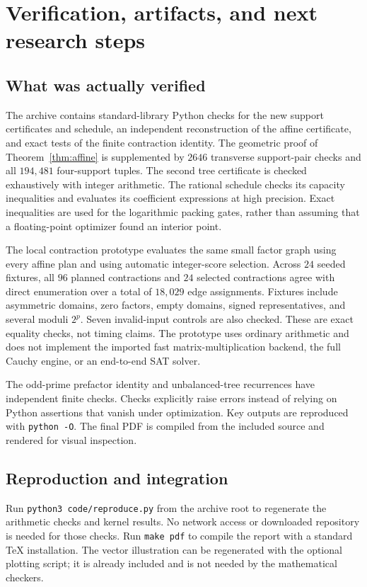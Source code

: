 \section{Verification, artifacts, and next research steps}
\label{sec:verification}

\subsection{What was actually verified}
The archive contains standard-library Python checks for the new support
certificates and schedule, an independent reconstruction of the affine
certificate, and exact tests of the finite contraction identity. The
geometric proof of Theorem~\ref{thm:affine} is supplemented by $2646$
transverse support-pair checks and all $194{,}481$ four-support tuples.
The second tree certificate is checked exhaustively with integer arithmetic.
The rational schedule checks its capacity inequalities and evaluates its
coefficient expressions at high precision. Exact inequalities are used for
the logarithmic packing gates, rather than assuming that a floating-point
optimizer found an interior point.

The local contraction prototype evaluates the same small factor graph using
every affine plan and using automatic integer-score selection. Across $24$
seeded fixtures, all $96$ planned contractions and $24$ selected contractions
agree with direct enumeration over a total of $18{,}029$ edge assignments.
Fixtures include asymmetric domains, zero factors, empty domains, signed
representatives, and several moduli $2^p$. Seven invalid-input controls are
also checked. These are exact equality checks, not timing claims. The
prototype uses ordinary arithmetic and does not implement the imported fast
matrix-multiplication backend, the full Cauchy engine, or an end-to-end SAT
solver.

The odd-prime prefactor identity and unbalanced-tree recurrences have
independent finite checks. Checks explicitly raise errors instead of relying
on Python assertions that vanish under optimization. Key outputs are
reproduced with \texttt{python -O}. The final PDF is compiled from the
included source and rendered for visual inspection.

\subsection{Reproduction and integration}
Run \texttt{python3 code/reproduce.py} from the archive root to regenerate
the arithmetic checks and kernel results. No network access or downloaded
repository is needed for those checks. Run \texttt{make pdf} to compile the
report with a standard TeX installation. The vector illustration can be
regenerated with the optional plotting script; it is already included and
is not needed by the mathematical checkers.

